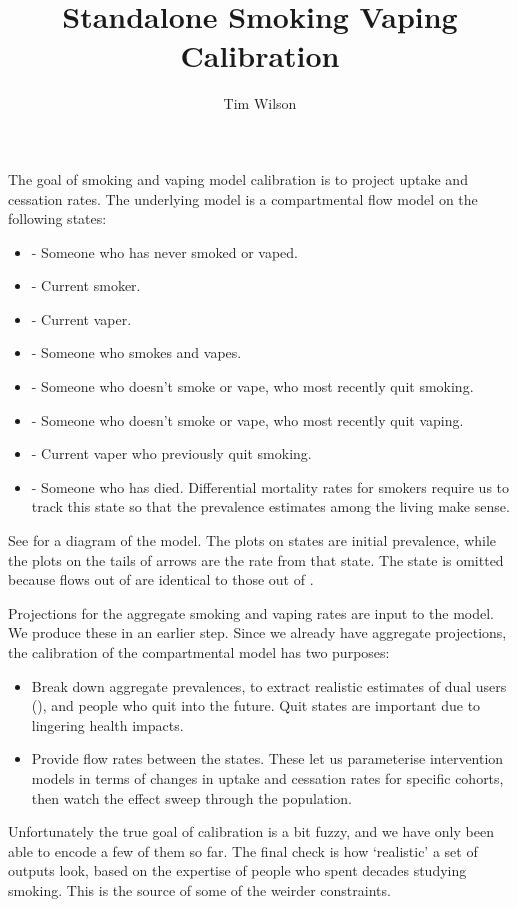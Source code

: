 \documentclass[]{article}
\title{Standalone Smoking Vaping Calibration}
\author{Tim Wilson}
\begin{document}
	
	\maketitle
	
	The goal of smoking and vaping model calibration is to project uptake and cessation rates. The underlying model is a compartmental flow model on the following states:
	\begin{itemize}
		\item {} - Someone who has never smoked or vaped.
		\item {} - Current smoker.
		\item {} - Current vaper.
		\item {} - Someone who smokes and vapes.
		\item {} - Someone who doesn't smoke or vape, who most recently quit smoking.
		\item {} - Someone who doesn't smoke or vape, who most recently quit vaping.
		\item {} - Current vaper who previously quit smoking.
		\item {} - Someone who has died. Differential mortality rates for smokers require us to track this state so that the prevalence estimates among the living make sense.
	\end{itemize}
	See  for a diagram of the model. The plots on states are initial prevalence, while the plots on the tails of arrows are the rate from that state. The state  is omitted because flows out of  are identical to those out of .
	
	Projections for the aggregate smoking and vaping rates are input to the model. We produce these in an earlier step. Since we already have aggregate projections, the calibration of the compartmental model has two purposes:
	\begin{itemize}
		\item Break down aggregate prevalences, to extract realistic estimates of dual users (), and people who quit into the future. Quit states are important due to lingering health impacts.
		\item Provide flow rates between the states. These let us parameterise intervention models in terms of changes in uptake and cessation rates for specific cohorts, then watch the effect sweep through the population.
	\end{itemize}
	Unfortunately the true goal of calibration is a bit fuzzy, and we have only been able to encode a few of them so far. The final check is how `realistic' a set of outputs look, based on the expertise of people who spent decades studying smoking. This is the source of some of the weirder constraints.
	
\end{document}
